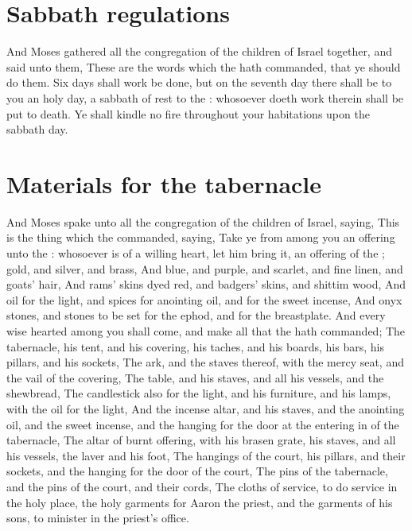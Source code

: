 \section*{Sabbath regulations}
\begin{biblechapter} %
\verse And Moses gathered all the congregation of the children of Israel together, and said unto them, These are the words which the \LORD hath commanded, that ye should do them.
\verse Six days shall work be done, but on the seventh day there shall be to you an holy day, a sabbath of rest to the \LORD: whosoever doeth work therein shall be put to death.
\verse Ye shall kindle no fire throughout your habitations upon the sabbath day.
\columnbreak %
\section*{Materials for the tabernacle}
\verse And Moses spake unto all the congregation of the children of Israel, saying, This is the thing which the \LORD commanded, saying,
\verse Take ye from among you an offering unto the \LORD: whosoever is of a willing heart, let him bring it, an offering of the \LORD; gold, and silver, and brass,
\verse And blue, and purple, and scarlet, and fine linen, and goats' hair,
\verse And rams' skins dyed red, and badgers' skins, and shittim wood,
\verse And oil for the light, and spices for anointing oil, and for the sweet incense,
\verse And onyx stones, and stones to be set for the ephod, and for the breastplate.
\verse And every wise hearted among you shall come, and make all that the \LORD hath commanded;
\verse The tabernacle, his tent, and his covering, his taches, and his boards, his bars, his pillars, and his sockets,
\verse The ark, and the staves thereof, with the mercy seat, and the vail of the covering,
\verse The table, and his staves, and all his vessels, and the shewbread,
\verse The candlestick also for the light, and his furniture, and his lamps, with the oil for the light,
\verse And the incense altar, and his staves, and the anointing oil, and the sweet incense, and the hanging for the door at the entering in of the tabernacle,
\verse The altar of burnt offering, with his brasen grate, his staves, and all his vessels, the laver and his foot,
\verse The hangings of the court, his pillars, and their sockets, and the hanging for the door of the court,
\verse The pins of the tabernacle, and the pins of the court, and their cords,
\verse The cloths of service, to do service in the holy place, the holy garments for Aaron the priest, and the garments of his sons, to minister in the priest's office.

\end{biblechapter}
